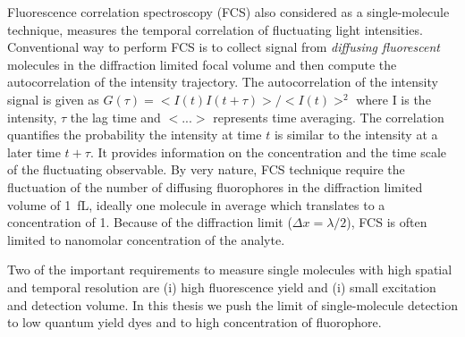 \documentclass[11pt,a4paper,onecolumn]{article}
\begin{document}
Fluorescence correlation spectroscopy (FCS) also considered as a single-molecule technique, measures the temporal correlation of fluctuating light intensities.
Conventional way to perform FCS is to collect signal from \textit{diffusing fluorescent} molecules in the diffraction limited focal volume and then compute the autocorrelation of the intensity trajectory.
The autocorrelation of the intensity signal is given as $G(\tau)=<I(t)I(t+\tau)>/<I(t)>^2$ where I is the intensity, $\tau$ the lag time and $<...>$ represents time averaging.
The correlation quantifies the probability the intensity at time $t$ is similar to the intensity at a later time $t+\tau$.
It provides information on the concentration and the time scale of the fluctuating observable.
By very nature, FCS technique require the fluctuation of the number of diffusing fluorophores in the diffraction limited volume of \SI{1}{fL}, ideally one molecule in average which translates to a concentration of \SI{1}{\nM}.
Because of the diffraction limit ($\Delta{x}={\lambda}/2$), FCS is often limited to nanomolar concentration of the analyte. 

Two of the important requirements to measure single molecules with high spatial and temporal resolution are (i) high fluorescence yield and (i) small excitation and detection volume.
In this thesis we push the limit of single-molecule detection to low quantum yield dyes and to high concentration of fluorophore.
\end{document}
